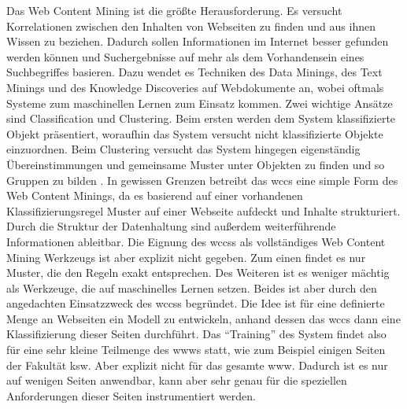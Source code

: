         Das Web Content Mining ist die größte Herausforderung.
        Es versucht Korrelationen zwischen den Inhalten von Webseiten zu finden
        und aus ihnen Wissen zu beziehen.
        Dadurch sollen Informationen im Internet besser gefunden werden können
        und Suchergebnisse auf mehr als dem Vorhandensein eines Suchbegriffes basieren.
        Dazu wendet es Techniken des Data Minings,
        des Text Minings und des Knowledge Discoveries auf Webdokumente an,
        wobei oftmals Systeme zum maschinellen Lernen zum Einsatz kommen.
        Zwei wichtige Ansätze sind Classification und Clustering.
        Beim ersten werden dem System klassifizierte Objekt präsentiert,
        woraufhin das System versucht nicht klassifizierte Objekte einzuordnen.
        Beim Clustering versucht das System hingegen eigenständig
        Übereinstimmungen und gemeinsame Muster unter Objekten zu finden
        und so Gruppen zu bilden
        \cite[Part II]{markov:webMining}.
        In gewissen Grenzen betreibt das \gls{wccs} eine simple Form des Web Content Minings,
        da es basierend auf einer vorhandenen Klassifizierungsregel
        Muster auf einer Webseite aufdeckt und Inhalte strukturiert.
        Durch die Struktur der Datenhaltung sind außerdem weiterführende Informationen ableitbar.
        Die Eignung des \glspl{wccs} als vollständiges Web Content Mining Werkzeugs ist
        aber explizit nicht gegeben.
        Zum einen findet es nur Muster, die den Regeln exakt entsprechen.
        Des Weiteren ist es weniger mächtig als Werkzeuge,
        die auf maschinelles Lernen setzen.
        Beides ist aber durch den angedachten Einsatzzweck des \glspl{wccs} begründet.
        Die Idee ist für eine definierte Menge an Webseiten ein Modell zu entwickeln,
        anhand dessen das \gls{wccs} dann eine Klassifizierung dieser Seiten durchführt.
        Das "`Training"' des System findet also für eine sehr kleine Teilmenge des \glspl{www} statt,
        wie zum Beispiel einigen Seiten der Fakultät \gls{ksw}.
        Aber explizit nicht für das gesamte \gls{www}.
        Dadurch ist es nur auf wenigen Seiten anwendbar,
        kann aber sehr genau für die speziellen Anforderungen dieser Seiten instrumentiert werden.      

